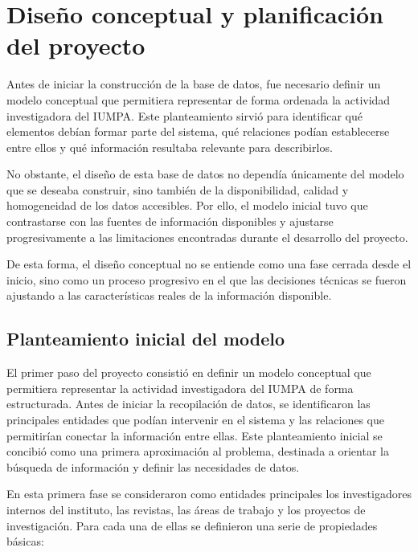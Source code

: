 \documentclass[11pt,spanish,listoffigures,listoftables]{tfgetsinf}
\begin{document}


\chapter{Diseño conceptual y planificación del proyecto}

Antes de iniciar la construcción de la base de datos, fue necesario definir un modelo conceptual que permitiera representar de forma ordenada la actividad investigadora del IUMPA. Este planteamiento sirvió para identificar qué elementos debían formar parte del sistema, qué relaciones podían establecerse entre ellos y qué información resultaba relevante para describirlos.

No obstante, el diseño de esta base de datos no dependía únicamente del modelo que se deseaba construir, sino también de la disponibilidad, calidad y homogeneidad de los datos accesibles. Por ello, el modelo inicial tuvo que contrastarse con las fuentes de información disponibles y ajustarse progresivamente a las limitaciones encontradas durante el desarrollo del proyecto.

De esta forma, el diseño conceptual no se entiende como una fase cerrada desde el inicio, sino como un proceso progresivo en el que las decisiones técnicas se fueron ajustando a las características reales de la información disponible.

\section{Planteamiento inicial del modelo}

El primer paso del proyecto consistió en definir un modelo conceptual que permitiera representar la actividad investigadora del IUMPA de forma estructurada. Antes de iniciar la recopilación de datos, se identificaron las principales entidades que podían intervenir en el sistema y las relaciones que permitirían conectar la información entre ellas. Este planteamiento inicial se concibió como una primera aproximación al problema, destinada a orientar la búsqueda de información y definir las necesidades de datos.

En esta primera fase se consideraron como entidades principales los investigadores internos del instituto, las revistas, las áreas de trabajo y los proyectos de investigación. Para cada una de ellas se definieron una serie de propiedades básicas:
\end{document}
